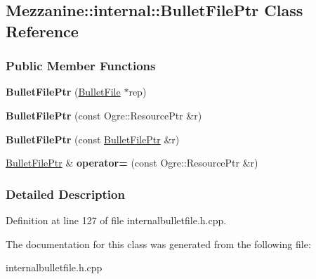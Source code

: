 \hypertarget{classMezzanine_1_1internal_1_1BulletFilePtr}{
\subsection{Mezzanine::internal::BulletFilePtr Class Reference}
\label{classMezzanine_1_1internal_1_1BulletFilePtr}
}
\subsubsection*{Public Member Functions}
\begin{DoxyCompactItemize}
\item 
\hypertarget{classMezzanine_1_1internal_1_1BulletFilePtr_a0ae2a0dfc380f54247e2c32917893a6b}{
{\bfseries BulletFilePtr} (\hyperlink{classMezzanine_1_1internal_1_1BulletFile}{BulletFile} $\ast$rep)}
\label{classMezzanine_1_1internal_1_1BulletFilePtr_a0ae2a0dfc380f54247e2c32917893a6b}

\item 
\hypertarget{classMezzanine_1_1internal_1_1BulletFilePtr_a4f52abf179f902c1b389fdb82e9f0637}{
{\bfseries BulletFilePtr} (const Ogre::ResourcePtr \&r)}
\label{classMezzanine_1_1internal_1_1BulletFilePtr_a4f52abf179f902c1b389fdb82e9f0637}

\item 
\hypertarget{classMezzanine_1_1internal_1_1BulletFilePtr_a2ef3676121ff2c869296c7aac9c5e461}{
{\bfseries BulletFilePtr} (const \hyperlink{classMezzanine_1_1internal_1_1BulletFilePtr}{BulletFilePtr} \&r)}
\label{classMezzanine_1_1internal_1_1BulletFilePtr_a2ef3676121ff2c869296c7aac9c5e461}

\item 
\hypertarget{classMezzanine_1_1internal_1_1BulletFilePtr_a8a47fe8d4c34e54d3e6316452f050227}{
\hyperlink{classMezzanine_1_1internal_1_1BulletFilePtr}{BulletFilePtr} \& {\bfseries operator=} (const Ogre::ResourcePtr \&r)}
\label{classMezzanine_1_1internal_1_1BulletFilePtr_a8a47fe8d4c34e54d3e6316452f050227}

\end{DoxyCompactItemize}


\subsubsection{Detailed Description}


Definition at line 127 of file internalbulletfile.h.cpp.



The documentation for this class was generated from the following file:\begin{DoxyCompactItemize}
\item 
internalbulletfile.h.cpp\end{DoxyCompactItemize}
